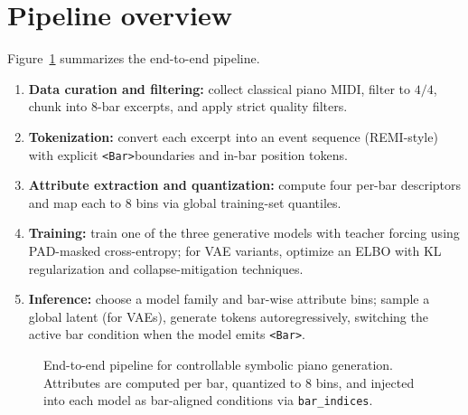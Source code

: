 \documentclass[10pt]{article}
\newcommand{\Bar}{\texttt{<Bar>}}
\begin{document}
\section{Pipeline overview}
Figure~\ref{fig:pipeline} summarizes the end-to-end pipeline.
\begin{enumerate}[leftmargin=*,itemsep=0pt]
  \item \textbf{Data curation and filtering:} collect classical piano MIDI, filter to $4/4$, chunk into 8-bar excerpts, and apply strict quality filters.
  \item \textbf{Tokenization:} convert each excerpt into an event sequence (REMI-style) with explicit \Bar boundaries and in-bar position tokens.
  \item \textbf{Attribute extraction and quantization:} compute four per-bar descriptors and map each to 8 bins via global training-set quantiles.
  \item \textbf{Training:} train one of the three generative models with teacher forcing using PAD-masked cross-entropy; for VAE variants, optimize an ELBO with KL regularization and collapse-mitigation techniques.
  \item \textbf{Inference:} choose a model family and bar-wise attribute bins; sample a global latent (for VAEs), generate tokens autoregressively, switching the active bar condition when the model emits \Bar.
\end{enumerate}

\begin{figure}[t]
\caption{End-to-end pipeline for controllable symbolic piano generation. Attributes are computed per bar, quantized to 8 bins, and injected into each model as bar-aligned conditions via \texttt{bar\_indices}.}
\label{fig:pipeline}
\centering
{}
\end{figure}
\end{document}
